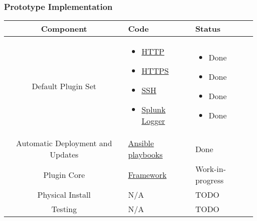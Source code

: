 \begin{frame}
\frametitle{Prototype Implementation}

\begin{table}
\centering
\small
\begin{tabularx}{\linewidth}{c X X}
\toprule
\textbf{Component} & \textbf{Code} & \textbf{Status} \\
\midrule
Default Plugin Set & \begin{itemize}[leftmargin=-0.3mm,after=\vspace{-\baselineskip},noitemsep,nolistsep]
                         \item[] \href{https://github.com/Senior-Design-May1601/webauth}{HTTP}
                         \item[] \href{https://github.com/Senior-Design-May1601/webauth}{HTTPS}
                         \item[] \href{https://github.com/Senior-Design-May1601/fssh}{SSH}
                         \item[] \href{https://github.com/Senior-Design-May1601/Splunk}{Splunk Logger}
                     \end{itemize} &
                    \begin{itemize}[leftmargin=-0.3mm,after=\vspace{-\baselineskip},noitemsep,nolistsep]
                         \item[] \textcolor{ao(english)}{Done}
                         \item[] \textcolor{ao(english)}{Done}
                         \item[] \textcolor{ao(english)}{Done}
                         \item[] \textcolor{ao(english)}{Done}
                     \end{itemize} \\ \hline
Automatic Deployment and Updates & \href{https://github.com/Senior-Design-May1601/config}{Ansible playbooks} & \textcolor{ao(english)}{Done} \\ \hline
Plugin Core & \href{https://github.com/Senior-Design-May1601/projectmain}{Framework} & Work-in-progress \\ \hline
Physical Install & N/A & \textcolor{bostonuniversityred}{TODO} \\ \hline
Testing & N/A & \textcolor{bostonuniversityred}{TODO} \\
\bottomrule
\end{tabularx}
\end{table}
\end{frame}
